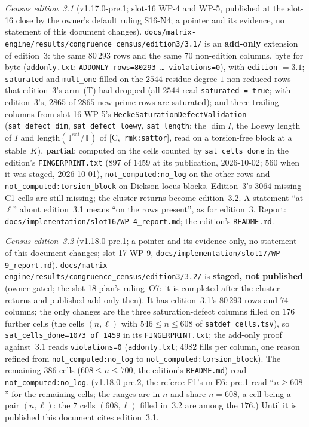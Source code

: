 \documentclass[11pt]{article}
\theoremstyle{remark}
\newcommand{\T}{\mathbb{T}}
\newcommand{\HA}[1]{[C,~\texttt{#1}]}      %
\begin{document}
\noindent\emph{Census edition~3.1} (v1.17.0-pre.1; slot-16 WP-4 and WP-5, published at the slot-16 close by the owner's default ruling S16-N4; a
pointer and its evidence, no statement of this document changes). \texttt{docs/matrix-engine/results/congruence\_census/edition3/3.1/} is an
\textbf{add-only} extension of edition~3: the same $80\,293$ rows and the same $70$ non-edition columns, byte for byte (\texttt{addonly.txt}:
\texttt{ADDONLY rows=80293 \dots{} violations=0}), with \texttt{edition} $=3.1$; \texttt{saturated} and \texttt{mult\_one} filled on the $2544$
residue-degree-$1$ non-reduced rows that edition~3's arm~(T) had dropped (all $2544$ read \texttt{saturated = true}; with edition~3's, $2865$ of $2865$
new-prime rows are saturated); and three trailing columns from slot-16 WP-5's \texttt{HeckeSaturationDefectValidation} (\texttt{sat\_defect\_dim},
\texttt{sat\_defect\_loewy}, \texttt{sat\_length}: the $\dim I$, the Loewy length of $I$ and $\mathrm{length}(\T^{\mathrm{sat}}/\T)$ of
\HA{rmk:sattor}, read on a torsion-free block at a stable~$K$), \textbf{partial}: computed on the cells counted by \texttt{sat\_cells\_done} in the
edition's \texttt{FINGERPRINT.txt} ($897$ of $1459$ at its publication, 2026-10-02; $560$ when it was staged, 2026-10-01), \texttt{not\_computed:no\_log} on the other rows and
\texttt{not\_computed:torsion\_block} on Dickson-locus blocks. Edition~3's $3064$ missing C1 cells are still missing; the cluster returns become
edition~3.2. A statement ``at $\ell$'' about edition~3.1 means ``on the rows present'', as for edition~3. Report:
\texttt{docs/implementation/slot16/WP-4\_report.md}; the edition's \texttt{README.md}.

\noindent\emph{Census edition~3.2} (v1.18.0-pre.1; a pointer and its evidence only, no statement of this document changes; slot-17 WP-9,
\texttt{docs/implementation/slot17/WP-9\_report.md}). \texttt{docs/matrix-engine/results/congruence\_census/edition3/3.2/} is \textbf{staged, not published}
(owner-gated; the slot-18 plan's ruling~O7: it is completed after the cluster returns and published add-only then). It has edition~3.1's $80\,293$ rows and
$74$ columns; the only changes are the three saturation-defect columns filled on $176$ further cells (the cells $(n,\ell)$ with $546\le n\le608$ of
\texttt{satdef\_cells.tsv}), so \texttt{sat\_cells\_done=1073 of 1459}
in its \texttt{FINGERPRINT.txt}; the add-only proof against~3.1 reads \texttt{violations=0} (\texttt{addonly.txt}; $4982$ fills per column, one reason refined from
\texttt{not\_computed:no\_log} to \texttt{not\_computed:torsion\_block}). The remaining $386$ cells ($608\le n\le700$, the edition's \texttt{README.md}) read
\texttt{not\_computed:no\_log}. (v1.18.0-pre.2, the referee F1's m-E6: pre.1 read ``$n\ge608$'' for the remaining cells; the ranges are in $n$ and share
$n=608$, a cell being a pair $(n,\ell)$: the $7$ cells $(608,\ell)$ filled in~3.2 are among the $176$.) Until it is published this document cites edition~3.1.
\end{document}

